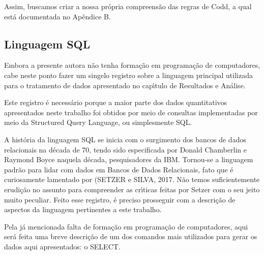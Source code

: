 \documentclass[
12pt,		%
openright,	%
twoside,  %
a4paper,			%
chapter=TITLE,		%
english,			%
french,				%
spanish,			%
brazil				%
]{USPSC-classe/USPSC}
\begin{document}
Assim, buscamos criar a nossa pr\'opria compreens\~ao das regras de Codd, a qual est\'a documentada no Ap\^endice B.









\subsection[Linguagem SQL]{Linguagem SQL}\label{Linguagem SQL}
Embora a presente autora n\~ao tenha forma\c{c}\~ao em programa\c{c}\~ao de computadores, cabe neste ponto fazer um singelo registro sobre a linguagem principal utilizada para o tratamento de dados apresentado no cap\'{\i}tulo de \textquotedbl Resultados e An\'alise\textquotedbl .









Este registro \'e necess\'ario porque a maior parte dos dados quantitativos apresentados neste trabalho foi obtidos por meio de consultas implementadas por meio da Structured Query Language, ou simplesmente SQL.









A hist\'oria da linguagem SQL se inicia com o surgimento dos bancos de dados relacionais na d\'ecada de 70, tendo sido  especificada por Donald Chamberlin e Raymond Boyce naquela d\'ecada, pesquisadores da IBM. Tornou-se a linguagem padr\~ao para lidar com dados em Bancos de Dados Relacionais, fato que \'e curiosamente lamentado por (SETZER e SILVA, 2017. N\~ao temos suficientemente erudi\c{c}\~ao no assunto para compreender as cr\'{\i}ticas feitas por Setzer com o seu jeito muito peculiar. Feito esse registro, \'e preciso prosseguir com a descri\c{c}\~ao de aspectos da linguagem pertinentes a este trabalho.









Pela j\'a mencionada falta de forma\c{c}\~ao em programa\c{c}\~ao de computadores, aqui ser\'a feita uma breve descri\c{c}\~ao de um dos comandos mais utilizados para gerar os dados aqui apresentados: o SELECT.
\end{document}
